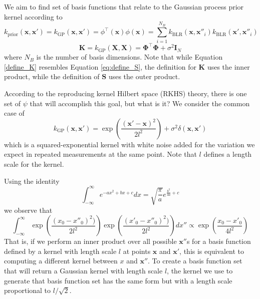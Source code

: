 \documentclass{article}
\begin{document}
We aim to find set of basis functions that relate to the Gaussian process prior kernel according to 
\begin{equation}
\label{GP_prior}
     k_\text{prior}(\mathbf{x},\mathbf{x}')=k_\text{GP}(\mathbf{x},\mathbf{x}') = \phi^\top(\mathbf{x})\phi(\mathbf{x}) = \sum_{i=1}^{N_B}k_\text{BLR}(\mathbf{x},\mathbf{x}''_i)k_\text{BLR}(\mathbf{x'},\mathbf{x}''_i)
\end{equation}
\begin{equation}
\label{define_K}
     \mathbf{K}=k_{\text{GP}}(\mathbf{X},\mathbf{X}) = \boldsymbol{\Phi}^\top \boldsymbol{\Phi} + \sigma^2 \mathbf{I}_N
\end{equation}
where $N_B$ is the number of basis dimensions. Note that while Equation \ref{define_K} resembles Equation \ref{eq:define_S}, the definition for $\mathbf{K}$ uses the inner product, while the definition of $\mathbf{S}$ uses the outer product.  

According to the reproducing kernel Hilbert space (RKHS) theory, there is one set of $\psi$ that will accomplish this goal, but what is it? We consider the common case of 
\begin{equation}
\label{kernel}
    k_\text{GP}(\mathbf{x},\mathbf{x}') = \exp\left(\frac{(\mathbf{x}'-\mathbf{x})^2}{2l^2}\right) + \sigma^2 \delta(\mathbf{x}, \mathbf{x}')
\end{equation}
which is a squared-exponential kernel with white noise added for the variation we expect in repeated measurements at the same point. Note that $l$ defines a length scale for the kernel.

Using the identity 
\begin{equation}
\label{gaussian_integral_identity}
    \int_{-\infty}^{\infty}e^{-a x^2 + b x + c}dx = \sqrt{\frac{\pi}{a}}e^{\frac{b^2}{4a}+c}
\end{equation}
we observe that 
\begin{equation}
\label{eq:gaussian_integral}
    \int_{-\infty}^{\infty}\exp\left(\frac{(x_0-x''_0)^2)}{2l^2}\right)\exp\left(\frac{(x'_0-x''_0)^2)}{2l^2}\right)dx''\propto\exp\left(\frac{x_0-x'_0}{4l^2}\right)
\end{equation}That is, if we perform an inner product over all possible $\mathbf{x}''$s for a basis function defined by a kernel with length scale $l$ at points $\mathbf{x}$ and $\mathbf{x}'$, this is equivalent to computing a different kernel between $x$ and $\mathbf{x}''$. To create a basis function set that will return a Gaussian kernel with length scale $l$, the kernel we use to generate that basis function set has the same form but with a length scale proportional to  $l/\sqrt{2}$.
\end{document}
